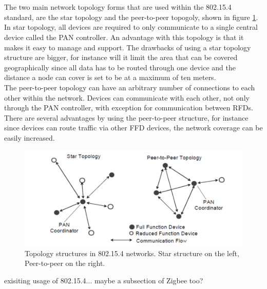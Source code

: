 \\\\
The two main network topology forms that are used within the 802.15.4 standard, are the star topology and the peer-to-peer topogoly, shown in figure \ref{fig:topology}. In star topology, all devices are required to only communicate to a single central device called the PAN controller. An advantage with this topology is that it makes it easy to manage and support. The drawbacks of using a star topology structure are bigger, for instance will it limit the area that can be covered geographically since all data has to be routed through one device and the distance a node can cover is set to be at a maximum of ten meters.\\
The peer-to-peer topology can have an arbitrary number of connections to each other within the network. Devices can communicate with each other, not only through the PAN controller, with exception for communication between RFDs. There are several advantages by using the peer-to-peer structure, for instance since devices can route traffic via other FFD devices, the network coverage can be easily increased.\\


\begin{figure}
	\includegraphics[width=\textwidth]{figures/802-15-4-topologies.png}
	\caption{Topology structures in 802.15.4 networks. Star structure on the left, Peer-to-peer on the right.}
	\label{fig:topology}
\end{figure}




exisiting usage of 802.15.4... maybe a subsection of Zigbee too?\\

